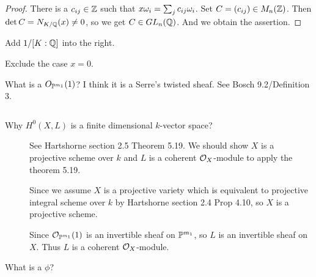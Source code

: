 


\begin{proof}
  There is a $c_{ij} \in \Z$ such that $x \gro_i = \sum_{j} c_{ij} \gro_i$. Set $C= (c_{ij}) \in M_n(\Z)$. Then $\det C = N_{K/\Q}(x) \neq 0 $, so we get $C \in GL_n(\Q)$. And we obtain the assertion.
\end{proof}

\begin{rem}
   Add $1/[K:\Q]$ into the right.
\end{rem}

\begin{rem}
   Exclude the case $x = 0$.
\end{rem}

\begin{rem}
What is a $O_{\P^{m_1} }(1)$? I think it is a Serre's twisted sheaf. See Bosch\cite{Bosch} 9.2/Definition 3.
\end{rem}


\begin{rem} ${}$
  \begin{description}
    \item[Why $H^0(X,L)$ is a finite dimensional $k$-vector space?]

    See Hartshorne\cite{ha} section 2.5 Theorem 5.19. We should show $X$ is a projective scheme over $k$ and $L$ is a coherent $\calo_X$-module to apply the theorem 5.19.

    Since we assume $X$ is a projective variety which is equivalent to projective integral scheme over $k$ by Hartshorne\cite{ha} section 2.4 Prop 4.10, so $X$ is a projective scheme.

    Since $\calo_{\P^{m_1}}(1)$ is an invertible sheaf on $\P^{m_1}$, so $L$ is an invertible sheaf on $X$. Thus $L$ is a coherent $\calo_X$-module.
    \item[What is a $\phi$?]

  \end{description}
\end{rem}
